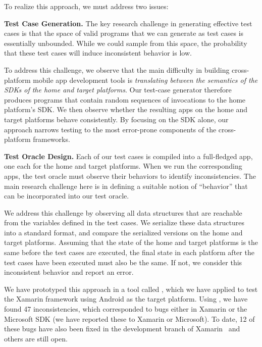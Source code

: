 To realize this approach, we must address two issues:
%
\begin{mylist}
%
\item \textbf{Test Case Generation.} The key research challenge in generating
effective test cases is that the space of valid programs that we can generate
as test cases is essentially unbounded. While we could sample from this space,
the probability that these test cases will induce inconsistent behavior is low.

To address this challenge, we observe that the main difficulty in building
cross-platform mobile app development tools is \textit{translating between the
semantics of the SDKs of the home and target platforms}. Our test-case
generator therefore produces programs that contain random sequences of
invocations to the home platform's SDK. We then observe whether the resulting
apps on the home and target platforms behave consistently. By focusing on the
SDK alone, our approach narrows testing to the most error-prone components of
the cross-platform frameworks.

\item \textbf{Test Oracle Design.} Each of our test cases is compiled into a
full-fledged app, one each for the home and target platforms. When we run the
corresponding apps, the test oracle must observe their behaviors to identify
inconsistencies. The main research challenge here is in defining a suitable
notion of ``behavior'' that can be incorporated into our test oracle.

We address this challenge by observing all data structures that are reachable
from the variables defined in the test cases. We serialize these data
structures into a standard format, and compare the serialized versions on the
home and target platforms. Assuming that the state of the home and target
platforms is the same before the test cases are executed, the final state in
each platform after the test cases have been executed must also be the same.
If not, we consider this inconsistent behavior and report an error.
%
\end{mylist}

We have prototyped this approach in a tool called \tool, which we have
applied to test the Xamarin framework using Android as the target
platform. Using \tool, we have found 47 inconsistencies, which
corresponded to bugs either in Xamarin or the Microsoft SDK (we have
reported these to Xamarin or Microsoft).  To date, 12 of these bugs
have also been fixed in the development branch of
Xamarin~\cite{xam:bzil:25895,xam:bzil:27901,xam:bzil:27910,xam:bzil:27922,xam:bzil:27982,xam:bzil:28017,xam:bzil:28123,xam:bzil:28134,xam:bzil:28562,xam:bzil:28571,xam:bzil:28572}
and others are still open.

